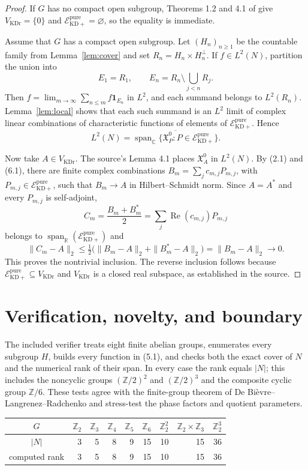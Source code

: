 \documentclass[11pt]{article}
\theoremstyle{remark}
\newcommand{\Epp}{\mathcal E_{\mathrm{KD}+}^{\mathrm{pure}}}
\newcommand{\VKD}{V_{\mathrm{KDr}}}
\newcommand{\X}{\mathfrak X}
\newcommand{\one}{\mathbf 1}
\begin{document}
\begin{proof}
If $G$ has no compact open subgroup, Theorems 1.2 and 4.1 of \cite{Spriet}
give $\VKD=\{0\}$ and $\Epp=\varnothing$, so the equality is immediate.

Assume that $G$ has a compact open subgroup.  Let $(H_n)_{n\geq1}$ be the
countable family from Lemma~\ref{lem:cover} and set
$R_n=H_n\times H_n^\perp$.  If $f\in L^2(N)$, partition the union into
\[
 E_1=R_1,\qquad E_n=R_n\setminus\bigcup_{j<n}R_j.
\]
Then
$f=\lim_{m\to\infty}\sum_{n\leq m}f\one_{E_n}$ in $L^2$, and each summand
belongs to $L^2(R_n)$.  Lemma~\ref{lem:local} shows that each such summand is
an $L^2$ limit of complex linear combinations of characteristic functions
of elements of $\Epp$.  Hence
\[
 L^2(N)=\overline{\operatorname{span}_{\mathbb C}
   \{\X_P^0:P\in\Epp\}}.                                   \tag{6.1}
\]

Now take $A\in\VKD$.  The source's Lemma 4.1 places $\X_A^0$ in $L^2(N)$.
By (2.1) and (6.1), there are finite complex combinations
$B_m=\sum_jc_{m,j}P_{m,j}$, with $P_{m,j}\in\Epp$, such that
$B_m\to A$ in Hilbert--Schmidt norm.  Since $A=A^*$ and every $P_{m,j}$ is
self-adjoint,
\[
 C_m=\frac{B_m+B_m^*}{2}
     =\sum_j\operatorname{Re}(c_{m,j})P_{m,j}
\]
belongs to $\operatorname{span}_{\mathbb R}(\Epp)$ and
\[
 \|C_m-A\|_2
 \leq\tfrac12\bigl(\|B_m-A\|_2+\|B_m^*-A\|_2\bigr)
 =\|B_m-A\|_2\longrightarrow0.
\]
This proves the nontrivial inclusion.  The reverse inclusion follows because
$\Epp\subseteq\VKD$ and $\VKD$ is a closed real subspace, as established in
the source.
\end{proof}

\section{Verification, novelty, and boundary}

The included verifier treats eight finite abelian groups, enumerates every
subgroup $H$, builds every function in (5.1), and checks both the exact cover
of $N$ and the numerical rank of their span.  In every case the rank equals
$|N|$; this includes the noncyclic groups $(\mathbb Z/2)^2$ and
$(\mathbb Z/2)^3$ and the composite cyclic group $\mathbb Z/6$.  These tests
agree with the finite-group theorem of De Bi\`evre--Langrenez--Radchenko
\cite{DLR} and stress-test the phase factors and quotient parameters.

\begin{center}
\small
\begin{tabular}{c|rrrrrrrr}
$G$ & $\mathbb Z_2$ & $\mathbb Z_3$ & $\mathbb Z_4$ & $\mathbb Z_5$ &
$\mathbb Z_6$ & $\mathbb Z_2^2$ & $\mathbb Z_2\!\times\!\mathbb Z_3$ &
$\mathbb Z_2^3$\\ \hline
$|N|$ &3&5&8&9&15&10&15&36\\
computed rank &3&5&8&9&15&10&15&36
\end{tabular}
\end{center}
\end{document}
